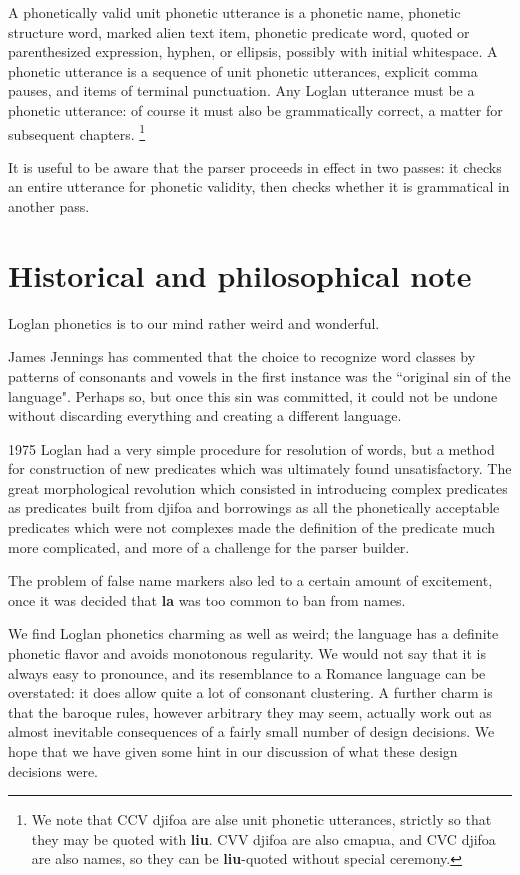 \documentclass[12pt]{book}
\begin{document}
{A phonetically valid unit phonetic utterance is a  phonetic name, phonetic structure word, marked alien text item, phonetic predicate word, quoted or parenthesized expression, hyphen, or ellipsis, possibly with initial whitespace.  A phonetic utterance is a sequence of unit phonetic utterances, explicit comma pauses, and items of terminal punctuation.  Any Loglan utterance must be a phonetic utterance:  of course it must also be grammatically correct, a matter for subsequent chapters.  \footnote{We note that CCV djifoa are alse unit phonetic utterances, strictly so that they may be quoted with {\bf liu}.  CVV djifoa are also cmapua, and CVC djifoa are also names, so they can be {\bf liu}-quoted without special ceremony.}

It is useful to be aware that the parser proceeds in effect in two passes:  it checks an entire utterance for phonetic validity, then checks whether it is grammatical in another pass.

\section{Historical and philosophical note}

Loglan phonetics is to our mind rather weird and wonderful.

James Jennings has commented that the choice to recognize word classes by patterns of consonants and vowels in the first instance was the ``original sin of the language".  Perhaps so, but once this sin was committed, it could not be undone without discarding everything and creating a different language.

1975 Loglan had a very simple procedure for resolution of words, but a method for construction of new predicates which was ultimately found unsatisfactory.  The great morphological revolution which consisted in introducing complex predicates as predicates built from djifoa and borrowings as all the phonetically acceptable predicates which were not complexes made the definition of the predicate much more complicated, and more of a challenge for the parser builder.

The problem of false name markers also led to a certain amount of excitement, once it was decided that {\bf la} was too common to ban from names.

We find Loglan phonetics charming as well as weird;  the language has a definite phonetic flavor and avoids monotonous regularity.  We would not say that it is always easy to pronounce, and its resemblance to a Romance language can be overstated:  it does allow quite a lot of consonant clustering.  A further charm is that the baroque rules, however arbitrary they may seem, actually work out as almost inevitable consequences of a fairly small number of design decisions.  We hope that we have given some hint in our discussion of what these design decisions were.

}
\end{document}
